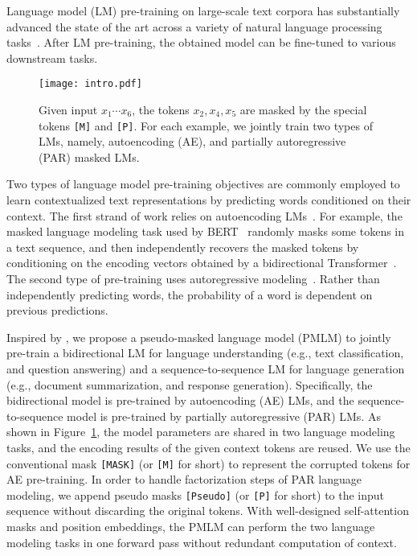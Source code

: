 \documentclass{article}
\newcommand\pmlmfull{pseudo-masked language model}
\newcommand\pmlm{\textsc{PMLM}}
\newcommand{\sptk}[1]{\texttt{[#1]}}
\begin{document}
Language model (LM) pre-training on large-scale text corpora has substantially advanced the state of the art across a variety of natural language processing tasks~\cite{elmo,gpt,bert,unilm,roberta,xlnet,bart,albert,t5}.
After LM pre-training, the obtained model can be fine-tuned to various downstream tasks.


\begin{figure}[t]
\centering
\texttt{[image: intro.pdf]}
\caption{
Given input $x_1\cdots x_6$, the tokens $x_2,x_4,x_5$ are masked by the special tokens \sptk{M} and \sptk{P}.
For each example, we jointly train two types of LMs, namely, autoencoding (AE), and partially autoregressive (PAR) masked LMs.
}
\label{fig:intro}
\end{figure}


Two types of language model pre-training objectives are commonly employed to learn contextualized text representations by predicting words conditioned on their context.
The first strand of work relies on autoencoding LMs~\cite{bert,roberta}.
For example, the masked language modeling task used by BERT~\cite{bert} randomly masks some tokens in a text sequence, and then independently recovers the masked tokens by conditioning on the encoding vectors obtained by a bidirectional Transformer~\cite{transformer}.
The second type of pre-training uses autoregressive modeling~\cite{gpt,bart,xlnet,t5}.
Rather than independently predicting words, the probability of a word is dependent on previous predictions.

Inspired by \cite{unilm}, we propose a \pmlmfull{} (\pmlm{}) to jointly pre-train a bidirectional LM for language understanding (e.g., text classification, and question answering) and a sequence-to-sequence LM for language generation (e.g., document summarization, and response generation).
Specifically, the bidirectional model is pre-trained by autoencoding (AE) LMs, and the sequence-to-sequence model is pre-trained by partially autoregressive (PAR) LMs.
As shown in Figure~\ref{fig:intro}, the model parameters are shared in two language modeling tasks, and the encoding results of the given context tokens are reused.
We use the conventional mask \sptk{MASK} (or \sptk{M} for short) to represent the corrupted tokens for AE pre-training.
In order to handle factorization steps of PAR language modeling, we append pseudo masks \sptk{Pseudo} (or \sptk{P} for short) to the input sequence without discarding the original tokens.
With well-designed self-attention masks and position embeddings, the \pmlm{} can perform the two language modeling tasks in one forward pass without redundant computation of context.
\end{document}

